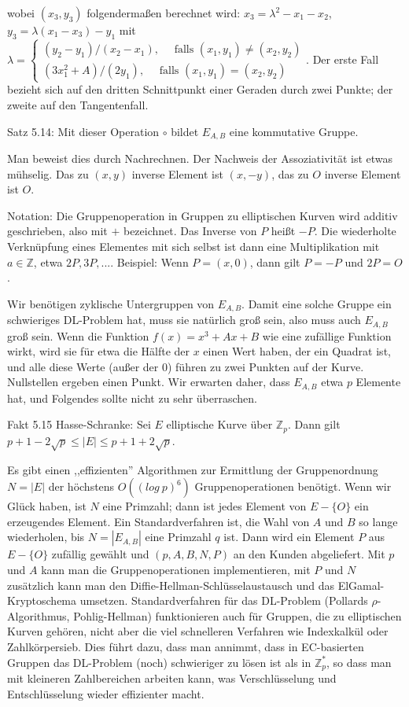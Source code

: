 \documentclass[a4paper]{article}
\begin{document}
\begin{multicols}{3}
{{{{            wobei $(x_3,y_3)$ folgendermaßen berechnet wird: $x_3=\lambda^2-x_1-x_2$, $y_3=\lambda(x_1-x_3)-y_1$ mit $\lambda=\begin{cases} (y_2-y_1)/(x_2-x_1),\quad\text{ falls } (x_1,y_1)\not= (x_2,y_2)\\ (3x^2_1+A)/(2y_1),\quad\text{ falls } (x_1,y_1) = (x_2,y_2)\end{cases}$.
            Der erste Fall bezieht sich auf den dritten Schnittpunkt einer Geraden durch zwei Punkte; der zweite auf den Tangentenfall.

            Satz 5.14: Mit dieser Operation $\circ$ bildet $E_{A,B}$ eine kommutative Gruppe.

            Man beweist dies durch Nachrechnen. Der Nachweis der Assoziativität ist etwas mühselig. Das zu $(x,y)$ inverse Element ist $(x,-y)$, das zu $O$ inverse Element ist $O$.

            Notation: Die Gruppenoperation in Gruppen zu elliptischen Kurven wird additiv geschrieben, also mit $+$ bezeichnet. Das Inverse von $P$ heißt $-P$. Die wiederholte Verknüpfung eines Elementes mit sich selbst ist dann eine Multiplikation mit $a\in\mathbb{Z}$, etwa $2P, 3P,...$.
            Beispiel: Wenn $P=(x,0)$, dann gilt $P=-P$ und $2P=O$.

            Wir benötigen zyklische Untergruppen von $E_{A,B}$. Damit eine solche Gruppe ein schwieriges DL-Problem hat, muss sie natürlich groß sein, also muss auch $E_{A,B}$ groß sein. Wenn die Funktion $f(x) =x^3+Ax+B$ wie eine zufällige Funktion wirkt, wird sie für etwa die Hälfte der $x$ einen Wert haben, der ein Quadrat ist, und alle diese Werte (außer der $0$) führen zu zwei Punkten auf der Kurve. Nullstellen ergeben einen Punkt. Wir erwarten daher, dass $E_{A,B}$ etwa $p$ Elemente hat, und Folgendes sollte nicht zu sehr überraschen.

            Fakt 5.15 Hasse-Schranke: Sei $E$ elliptische Kurve über $\mathbb{Z}_p$. Dann gilt $p+ 1- 2\sqrt{p}\leq |E|\leq p+1 + 2\sqrt{p}$.

            Es gibt einen ,,effizienten'' Algorithmen zur Ermittlung der Gruppenordnung $N=|E|$ der höchstens $O((log\ p)^6)$ Gruppenoperationen benötigt. Wenn wir Glück haben, ist $N$ eine Primzahl; dann ist jedes Element von $E-\{O\}$ ein erzeugendes Element. Ein Standardverfahren ist, die Wahl von $A$ und $B$ so lange wiederholen, bis $N=|E_{A,B}|$ eine Primzahl $q$ ist. Dann wird ein Element $P$ aus $E-\{O\}$ zufällig gewählt und $(p,A,B,N,P)$ an den Kunden abgeliefert. Mit $p$ und $A$ kann man die Gruppenoperationen implementieren, mit $P$ und $N$ zusätzlich kann man den Diffie-Hellman-Schlüsselaustausch und das ElGamal-Kryptoschema umsetzen.
            Standardverfahren für das DL-Problem (Pollards $ρ$-Algorithmus, Pohlig-Hellman) funktionieren auch für Gruppen, die zu elliptischen Kurven gehören, nicht aber die viel schnelleren Verfahren wie Indexkalkül oder Zahlkörpersieb. Dies führt dazu, dass man annimmt, dass in EC-basierten Gruppen das DL-Problem (noch) schwieriger zu lösen ist als in $\mathbb{Z}^*_p$, so dass man mit kleineren Zahlbereichen arbeiten kann, was Verschlüsselung und Entschlüsselung wieder effizienter macht.

}}}}
\end{multicols}
\end{document}
